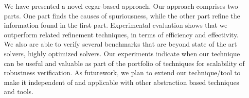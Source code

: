 We have presented a novel cegar-based approach. Our approach comprises two parts. One part finds the causes of spuriousness, 
while the other part refine  the information found in the first part. 
Experimental evaluation shows that we outperform related refinement techniques, in terms of efficiency and effectivity. 
We also are able to verify several benchmarks that are beyond state of the art solvers, highly optimized solvers. Our experiments indicate when our technique can be useful and valuable as part of the portfolio of techniques for scalability of robustness verification. As futurework, we plan to extend our technique/tool to make it independent of \deeppoly{} and applicable with other 
abstraction based techniques and tools. %



